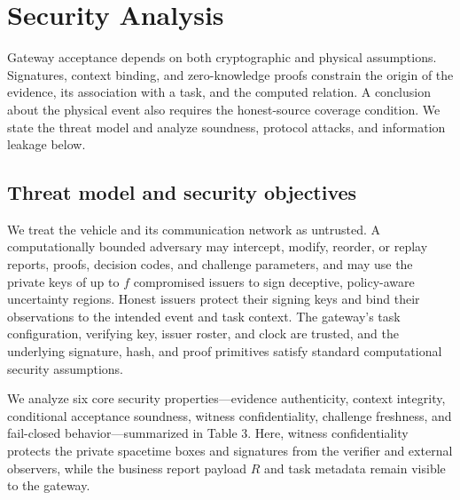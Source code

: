 \section{Security Analysis}\label{sec:security}
Gateway acceptance depends on both cryptographic and physical assumptions. Signatures, context binding, and zero-knowledge proofs constrain the origin of the evidence, its association with a task, and the computed relation. A conclusion about the physical event also requires the honest-source coverage condition. We state the threat model and analyze soundness, protocol attacks, and information leakage below.

\subsection{Threat model and security objectives}
We treat the vehicle and its communication network as untrusted. A computationally bounded adversary may intercept, modify, reorder, or replay reports, proofs, decision codes, and challenge parameters, and may use the private keys of up to $f$ compromised issuers to sign deceptive, policy-aware uncertainty regions. Honest issuers protect their signing keys and bind their observations to the intended event and task context. The gateway's task configuration, verifying key, issuer roster, and clock are trusted, and the underlying signature, hash, and proof primitives satisfy standard computational security assumptions.

We analyze six core security properties---evidence authenticity, context integrity, conditional acceptance soundness, witness confidentiality, challenge freshness, and fail-closed behavior---summarized in Table 3. Here, witness confidentiality protects the private spacetime boxes and signatures from the verifier and external observers, while the business report payload $R$ and task metadata remain visible to the gateway.

